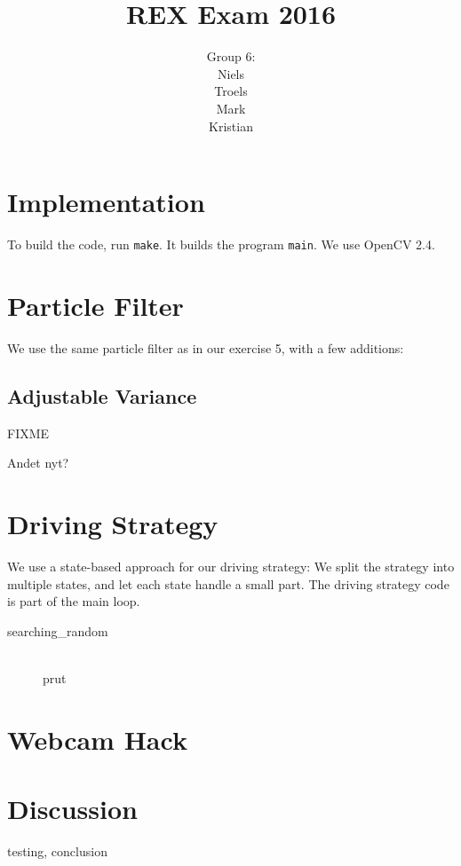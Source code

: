 \documentclass[a4paper,12pt]{article}
\title{REX Exam 2016}
\author{Group 6:\\Niels\\Troels\\Mark\\Kristian}
\begin{document}
\maketitle
\newpage
\section{Implementation}

To build the code, run \texttt{make}.  It builds the program \texttt{main}.  We
use OpenCV 2.4.


\section{Particle Filter}

We use the same particle filter as in our exercise 5, with a few additions:

\subsection{Adjustable Variance}

FIXME

Andet nyt?


\section{Driving Strategy}

We use a state-based approach for our driving strategy: We split the strategy
into multiple states, and let each state handle a small part.  The driving
strategy code is part of the main loop.

\begin{description}
\item[searching_random]\hfill\\
prut\end{description}


\section{Webcam Hack}



\section{Discussion}

testing, conclusion
\end{document}
